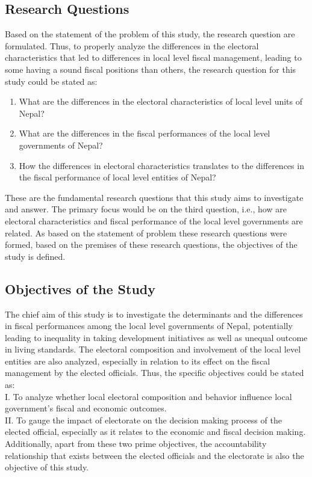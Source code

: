 \subsection{Research Questions}
Based on the statement of the problem of this study, the research question are formulated. Thus, to properly analyze the differences in the electoral characteristics that led to differences in local level fiscal management, leading to some having a sound fiscal positions than others, the research question for this study could be stated as:
\begin{enumerate}[label=\roman*.]
    \item What are the differences in the electoral characteristics of  local level units of Nepal? 
    \item What are the differences in the fiscal performances of the local level governments of Nepal?
    \item How the differences in electoral characteristics translates to the differences in the fiscal performance of local level entities of Nepal?
 \end{enumerate}
 These are the fundamental research questions that this study aims to investigate and answer. The primary focus would be on the third question, i.e., how are electoral characteristics and fiscal performance of the local level governments are related. As based on the statement of problem these research questions were formed, based on the premises of these research questions, the objectives of the study is defined. \vspace{-4mm}
\subsection{Objectives of the Study}
The chief aim of this study is to investigate the determinants and the differences in fiscal performances among the local level governments of Nepal, potentially leading to inequality in taking development initiatives as well as unequal outcome in living standards. The electoral composition and involvement of the local level entities are also analyzed, especially in relation to its effect on the fiscal management by the elected officials. Thus, the specific objectives could be stated as:\\
I.\hspace{3mm} To analyze whether local electoral composition and behavior influence local government's fiscal and economic outcomes.  \\
II.\hspace{3mm} To gauge the impact of electorate on the decision making process of the elected official, especially as it relates to the economic and fiscal decision making.\\
Additionally, apart from these two prime objectives, the accountability relationship that exists between the elected officials and  the electorate is also the objective of this study. \vspace{-3mm}
